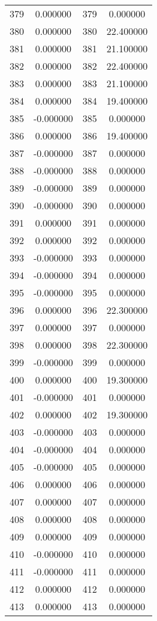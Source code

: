\documentclass[12pt]{article}
\begin{document}
\begin{longtable}{@{}cccc@{}}
379 & 0.000000 & 379 & 0.000000 \\
380 & 0.000000 & 380 & 22.400000 \\
381 & 0.000000 & 381 & 21.100000 \\
382 & 0.000000 & 382 & 22.400000 \\
383 & 0.000000 & 383 & 21.100000 \\
384 & 0.000000 & 384 & 19.400000 \\
385 & -0.000000 & 385 & 0.000000 \\
386 & 0.000000 & 386 & 19.400000 \\
387 & -0.000000 & 387 & 0.000000 \\
388 & -0.000000 & 388 & 0.000000 \\
389 & -0.000000 & 389 & 0.000000 \\
390 & -0.000000 & 390 & 0.000000 \\
391 & 0.000000 & 391 & 0.000000 \\
392 & 0.000000 & 392 & 0.000000 \\
393 & -0.000000 & 393 & 0.000000 \\
394 & -0.000000 & 394 & 0.000000 \\
395 & -0.000000 & 395 & 0.000000 \\
396 & 0.000000 & 396 & 22.300000 \\
397 & 0.000000 & 397 & 0.000000 \\
398 & 0.000000 & 398 & 22.300000 \\
399 & -0.000000 & 399 & 0.000000 \\
400 & 0.000000 & 400 & 19.300000 \\
401 & -0.000000 & 401 & 0.000000 \\
402 & 0.000000 & 402 & 19.300000 \\
403 & -0.000000 & 403 & 0.000000 \\
404 & -0.000000 & 404 & 0.000000 \\
405 & -0.000000 & 405 & 0.000000 \\
406 & 0.000000 & 406 & 0.000000 \\
407 & 0.000000 & 407 & 0.000000 \\
408 & 0.000000 & 408 & 0.000000 \\
409 & 0.000000 & 409 & 0.000000 \\
410 & -0.000000 & 410 & 0.000000 \\
411 & -0.000000 & 411 & 0.000000 \\
412 & 0.000000 & 412 & 0.000000 \\
413 & 0.000000 & 413 & 0.000000 \\

\end{longtable}
\end{document}
